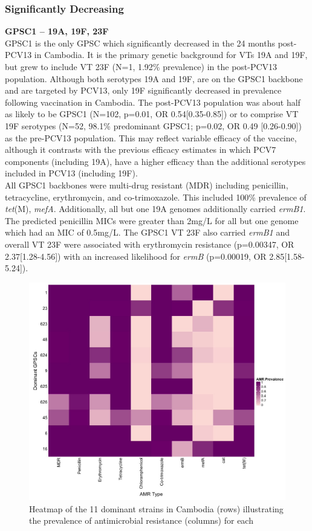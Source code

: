 \documentclass{article}
\begin{document}
\subsubsection{Significantly Decreasing}
\textbf{GPSC1 – 19A, 19F, 23F}
\\GPSC1 is the only GPSC which significantly decreased in the 24 months post-PCV13 in Cambodia. It is the primary genetic background for VTs 19A and 19F, but grew to include VT 23F (N=1, 1.92\% prevalence) in the post-PCV13 population. Although both serotypes 19A and 19F, are on the GPSC1 backbone and are targeted by PCV13, only 19F significantly decreased in prevalence following vaccination in Cambodia. The post-PCV13 population was about half as likely to be GPSC1 (N=102, p=0.01, OR 0.54[0.35-0.85]) or to comprise VT 19F serotypes (N=52, 98.1\% predominant GPSC1; p=0.02, OR 0.49 [0.26-0.90]) as the pre-PCV13 population. This may reflect variable efficacy of the vaccine, although it contrasts with the previous efficacy estimates in which PCV7 components (including 19A), have a higher efficacy than the additional serotypes included in PCV13 (including 19F)\cite{isturizStreptococcusPneumoniaeSerotype2017}.  
\\All GPSC1 backbones were multi-drug resistant (MDR) including penicillin, tetracycline, erythromycin, and co-trimoxazole. This included 100\% prevalence of \textit{tet}(M), \textit{mefA}. Additionally, all but one 19A genomes additionally carried \textit{ermB1}. The predicted penicillin MICs were greater than 2mg/L for all but one genome which had an MIC of 0.5mg/L. The GPSC1 VT 23F also carried \textit{ermB1} and overall VT 23F were associated with erythromycin resistance (p=0.00347, OR 2.37[1.28-4.56]) with an increased likelihood for \textit{ermB} (p=0.00019, OR 2.85[1.58-5.24]). 
\begin{figure}
\centering
    \includegraphics[width=\textwidth]{top11_prevalence.jpeg}
    \caption{Heatmap of the 11 dominant strains in Cambodia (rows) illustrating the prevalence of antimicrobial resistance (columns) for each}
    \label{amr11}
\end{figure}
\end{document}
